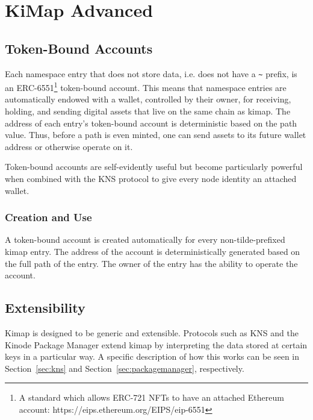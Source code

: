 \documentclass[runningheads]{llncs}
\begin{document}
%
%
%
\section{KiMap Advanced}
\label{sec:kimapadvanced}

\subsection{Token-Bound Accounts}
\label{sec:tokenboundaccounts}

Each namespace entry that does not store data, i.e. does not have a \verb|~| prefix, is an ERC-6551\footnote{A standard which allows ERC-721 NFTs to have an attached Ethereum account:  https://eips.ethereum.org/EIPS/eip-6551} token-bound account.
This means that namespace entries are automatically endowed with a wallet, controlled by their owner, for receiving, holding, and sending digital assets that live on the same chain as kimap.
The address of each entry's token-bound account is deterministic based on the path value.
Thus, before a path is even minted, one can send assets to its future wallet address or otherwise operate on it.

Token-bound accounts are self-evidently useful but become particularly powerful when combined with the KNS protocol to give every node identity an attached wallet.

\subsubsection{Creation and Use}

A token-bound account is created automatically for every non-tilde-prefixed kimap entry.
The address of the account is deterministically generated based on the full path of the entry.
The owner of the entry has the ability to operate the account.


\subsection{Extensibility}
\label{sec:extensibility}

Kimap is designed to be generic and extensible.
Protocols such as KNS and the Kinode Package Manager extend kimap by interpreting the data stored at certain keys in a particular way.
A specific description of how this works can be seen in Section~\ref{sec:kns} and Section~\ref{sec:packagemanager}, respectively.
\end{document}
